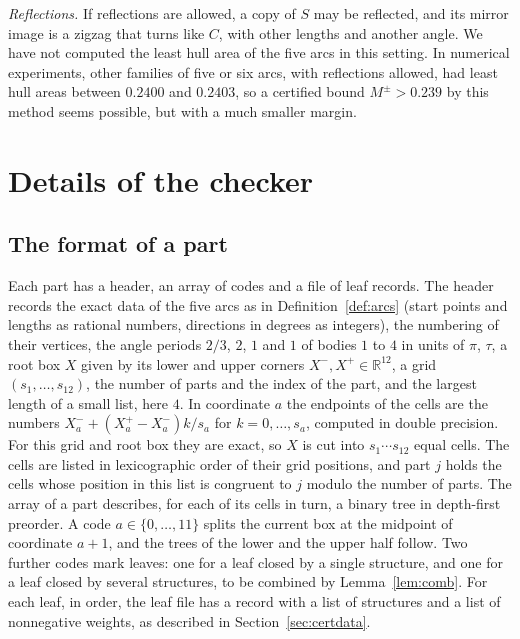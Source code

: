 \documentclass[11pt]{amsart}
\theoremstyle{definition}
\theoremstyle{remark}
\numberwithin{equation}{section}
\newcommand{\R}{\mathbb{R}}
\newcommand{\Mpm}{M^{\pm}}
\begin{document}
\emph{Reflections.} If reflections are allowed, a copy of $S$ may be reflected, and its mirror image is a zigzag that turns like $C$, with other lengths and another angle. We have not computed the least hull area of the five arcs in this setting. In numerical experiments, other families of five or six arcs, with reflections allowed, had least hull areas between $0.2400$ and $0.2403$, so a certified bound $\Mpm>0.239$ by this method seems possible, but with a much smaller margin.

\appendix

\section{Details of the checker}\label{app:checker}

\subsection{The format of a part}\label{app:format}
Each part has a header, an array of codes and a file of leaf records. The header records the exact data of the five arcs as in Definition~\ref{def:arcs} (start points and lengths as rational numbers, directions in degrees as integers), the numbering of their vertices, the angle periods $2/3$, $2$, $1$ and $1$ of bodies $1$ to $4$ in units of $\pi$, $\tau$, a root box $X$ given by its lower and upper corners $X^-,X^+\in\R^{12}$, a grid $(s_1,\dots,s_{12})$, the number of parts and the index of the part, and the largest length of a small list, here $4$. In coordinate $a$ the endpoints of the cells are the numbers $X^-_a+(X^+_a-X^-_a)k/s_a$ for $k=0,\dots,s_a$, computed in double precision. For this grid and root box they are exact, so $X$ is cut into $s_1\cdots s_{12}$ equal cells. The cells are listed in lexicographic order of their grid positions, and part $j$ holds the cells whose position in this list is congruent to $j$ modulo the number of parts. The array of a part describes, for each of its cells in turn, a binary tree in depth-first preorder. A code $a\in\{0,\dots,11\}$ splits the current box at the midpoint of coordinate $a+1$, and the trees of the lower and the upper half follow. Two further codes mark leaves: one for a leaf closed by a single structure, and one for a leaf closed by several structures, to be combined by Lemma~\ref{lem:comb}. For each leaf, in order, the leaf file has a record with a list of structures and a list of nonnegative weights, as described in Section~\ref{sec:certdata}.
\end{document}
